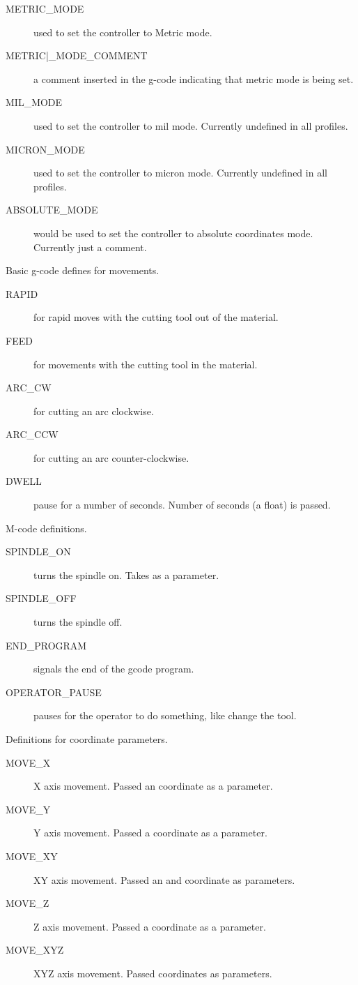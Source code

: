 \documentclass[11pt]{book}
\begin{document}
\begin{description}
\begin{description}
    \item[METRIC\_{}MODE] used to set the controller to Metric mode.
    
    \item[METRIC|\_{}MODE\_{}COMMENT] a comment inserted in the g-code indicating that metric mode is being set.
    
    \item[MIL\_{}MODE] used to set the controller to mil mode. Currently undefined in all profiles.
    
    \item[MICRON\_{}MODE] used to set the controller to micron mode. Currently undefined in all profiles.
    
    \item[ABSOLUTE\_{}MODE] would be used to set the controller to absolute coordinates mode. Currently just a comment.
\end{description}

\item[G Codes] Basic g-code defines for movements.
\begin{description}
    \item[RAPID] for rapid moves with the cutting tool out of the material.
    \item[FEED] for movements with the cutting tool in the material.
    \item[ARC\_{}CW] for cutting an arc clockwise.
    \item[ARC\_{}CCW] for cutting an arc counter-clockwise.
    \item[DWELL] pause for a number of seconds. Number of seconds (a float) is passed.
\end{description}

\item[M Codes] M-code definitions.
\begin{description}
	\item[SPINDLE\_{}ON] turns the spindle on. Takes  as a parameter.
	\item[SPINDLE\_{}OFF] turns the spindle off.
	\item[END\_{}PROGRAM] signals the end of the gcode program.
	\item[OPERATOR\_{}PAUSE] pauses for the operator to do something, like change the tool.
\end{description}

\item[Coordinates] Definitions for coordinate parameters.
\begin{description}
	\item[MOVE\_{}X] X axis movement. Passed an  coordinate as a parameter.
	\item[MOVE\_{}Y] Y axis movement. Passed a  coordinate as a parameter.
	\item[MOVE\_{}XY] XY axis movement. Passed an  and  coordinate as parameters.
	\item[MOVE\_{}Z] Z axis movement. Passed a  coordinate as a parameter.
	\item[MOVE\_{}XYZ] XYZ axis movement. Passed  coordinates as parameters.
\end{description}


\end{description}
\end{document}
